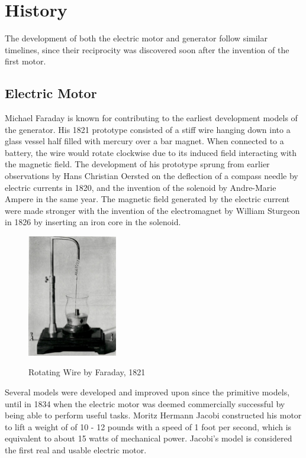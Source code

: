 \section{History}
The development of both the electric motor and generator follow similar timelines, since their reciprocity was discovered soon after the invention of the first motor.

    \subsection{Electric Motor}
    Michael Faraday is known for contributing to the earliest development models of the generator. His 1821 prototype consisted of a stiff wire hanging down into a glass vessel half filled with mercury over a bar magnet. When connected to a battery, the wire would rotate clockwise due to its induced field interacting with the magnetic field. \cite{firstmotor} The development of his prototype sprung from earlier observations by Hans Christian Oersted on the deflection of a compass needle by electric currents in 1820, and the invention of the solenoid by Andre-Marie Ampere in the same year. \cite{needcite} The magnetic field generated by the electric current were made stronger with the invention of the electromagnet by William Sturgeon in 1826 by inserting an iron core in the solenoid. \cite{needcite} \\

    \begin{figure}[ht]
        \begin{center}
            \includegraphics[width=0.35\textwidth]{figures/history/rotating_wire.jpg}
            \label{fig:faraday}
        \end{center} \caption{Rotating Wire by Faraday, 1821}
    \end{figure}

    \noindent
    Several models were developed and improved upon since the primitive models, until in 1834 when the electric motor was deemed commercially successful by being able to perform useful tasks. Moritz Hermann Jacobi constructed his motor to lift a weight of of 10 - 12 pounds with a speed of 1 foot per second, which is equivalent to about 15 watts of mechanical power. \cite{needcite} Jacobi’s model is considered the first real and usable electric motor.

